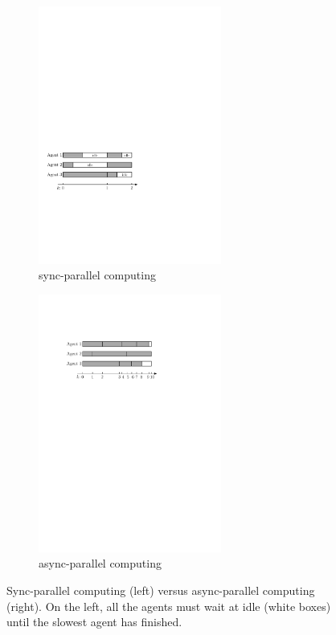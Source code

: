 \begin{figure} \centering
    \begin{subfigure}[b]{0.45\linewidth}
        \includegraphics[width=60mm]{./figs/syn-simple}
        \caption{sync-parallel computing}
        \label{fig:parallel_a}
    \end{subfigure} %
    \quad
    \begin{subfigure}[b]{0.45\linewidth}
        \includegraphics[width=60mm]{./figs/asyn-simple}
        \caption{async-parallel computing}
        \label{fig:parallel_b}
    \end{subfigure} %
    \caption{ Sync-parallel computing (left) versus async-parallel computing (right). On the left, all the agents must wait at idle (white boxes) until the slowest agent has finished.}
    \label{fig:comp_sync_async}
\end{figure}


